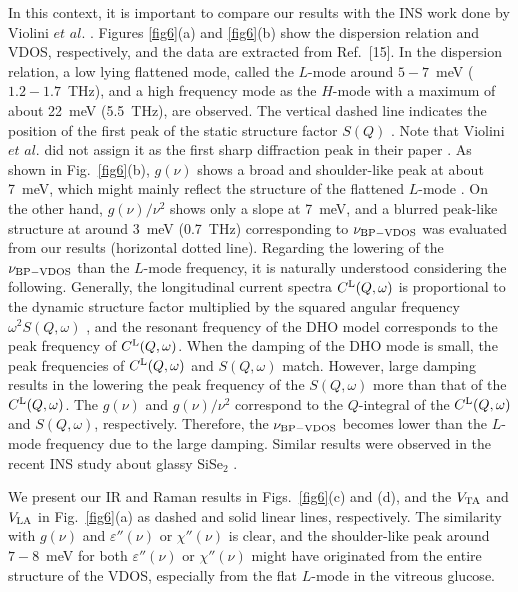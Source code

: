 \documentclass[%
 reprint,
superscriptaddress,
 amsmath,amssymb,
 aps,
prb,
]{revtex4-1}
\begin{document}
In this context, it is important to compare our results with the INS work done by Violini $et$ $al$. \cite{Violini2012} . Figures \ref{fig6}(a) and \ref{fig6}(b) show the dispersion relation and VDOS, respectively, and the data are extracted from Ref.~[15]. In the dispersion relation, a low lying flattened mode, called the $L$-mode around $5-7$~meV ($1.2-1.7$~THz), and a high frequency mode as the $H$-mode with a maximum of about 22~meV (5.5~THz), are observed.
The vertical dashed line indicates the position of the first peak of the static structure factor $S(Q)$ \cite{Violini2012}.
Note that Violini $et$ $al$. did not assign it as the first sharp diffraction peak in their paper \cite{Violini2012}.
As shown in Fig.~\ref{fig6}(b), $g(\nu)$ shows a broad and shoulder-like peak at about 7~meV, which might mainly reflect the structure of the flattened $L$-mode \cite{Violini2012}.
On the other hand, $g(\nu)/\nu^{2}$ shows only a slope at 7~meV, and a blurred peak-like structure at around 3~meV (0.7~THz) corresponding to $\nu_{\rm BP-VDOS}$ was evaluated from our results (horizontal dotted line).
Regarding the lowering of the $\nu_{\rm BP-VDOS}$ than the $L$-mode frequency, it is naturally understood considering the following.
Generally, the longitudinal current spectra $C^{\rm L}(Q, \omega)$ is proportional to the dynamic structure factor multiplied by the squared angular frequency $\omega^{2}S(Q, \omega)$ \cite{Pilla2004, Schirmacher2015}, and the resonant frequency of the DHO model corresponds to the peak frequency of $C^{\rm L}(Q, \omega)$.
When the damping of the DHO mode is small, the peak frequencies of $C^{\rm L}(Q, \omega)$ and $S(Q, \omega)$ match.
However, large damping results in the lowering the peak frequency of the $S(Q, \omega)$ more than that of the $C^{\rm L}(Q, \omega)$.
The $g(\nu)$ and $g(\nu)/\nu^{2}$ correspond to the $Q$-integral of the $C^{\rm L}(Q, \omega)$ and $S(Q, \omega)$, respectively.
Therefore, the $\nu_{\rm BP-VDOS}$ becomes lower than the $L$-mode frequency due to the large damping.
Similar results were observed in the recent INS study about glassy SiSe$_{2}$ \cite{Zanatta2013}.

We present our IR and Raman results in Figs.~\ref{fig6}(c) and (d), and the $V_{\rm TA}$ and $V_{\rm LA}$ in Fig.~\ref{fig6}(a) as dashed and solid linear lines, respectively. The similarity with $g(\nu)$ and $\varepsilon''(\nu)$ or $\chi''(\nu)$ is clear,  and the shoulder-like peak around $7-8$~meV for both $\varepsilon''(\nu)$ or $\chi''(\nu)$ might have originated from the entire structure of the VDOS, especially from the flat $L$-mode in the vitreous glucose.
\end{document}
